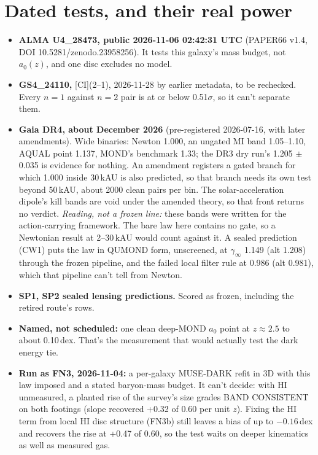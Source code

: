 \documentclass[10pt]{article}
\begin{document}
\section{Dated tests, and their real power}
\begin{itemize}
\item \textbf{ALMA U4\_28473, public 2026-11-06 02:42:31 UTC} (PAPER66 v1.4, DOI 10.5281/zenodo.23958256). It tests this galaxy's mass budget, not $a_0(z)$, and one disc excludes no model.
\item \textbf{GS4\_24110,} [CI](2--1), 2026-11-28 by earlier metadata, to be rechecked. Every $n=1$ against $n=2$ pair is at or below 0.51$\sigma$, so it can't separate them.
\item \textbf{Gaia DR4, about December 2026} (pre-registered 2026-07-16, with later amendments). Wide binaries: Newton 1.000, an ungated MI band 1.05--1.10, AQUAL point 1.137, MOND's benchmark 1.33; the DR3 dry run's 1.205 $\pm$ 0.035 is evidence for nothing. An amendment registers a gated branch for which 1.000 inside 30\,kAU is also predicted, so that branch needs its own test beyond 50\,kAU, about 2000 clean pairs per bin. The solar-acceleration dipole's kill bands are void under the amended theory, so that front returns no verdict. \emph{Reading, not a frozen line:} these bands were written for the action-carrying framework. The bare law here contains no gate, so a Newtonian result at 2--30\,kAU would count against it. A sealed prediction (CW1) puts the law in QUMOND form, unscreened, at $\gamma_\infty$ 1.149 (alt 1.208) through the frozen pipeline, and the failed local filter rule at 0.986 (alt 0.981), which that pipeline can't tell from Newton.
\item \textbf{SP1, SP2 sealed lensing predictions.} Scored as frozen, including the retired route's rows.
\item \textbf{Named, not scheduled:} one clean deep-MOND $a_0$ point at $z\approx2.5$ to about 0.10\,dex. That's the measurement that would actually test the dark energy tie.
\item \textbf{Run as FN3, 2026-11-04:} a per-galaxy MUSE-DARK refit in 3D with this law imposed and a stated baryon-mass budget. It can't decide: with HI unmeasured, a planted rise of the survey's size grades BAND CONSISTENT on both footings (slope recovered +0.32 of 0.60 per unit $z$). Fixing the HI term from local HI disc structure (FN3b) still leaves a bias of up to $-0.16$\,dex and recovers the rise at +0.47 of 0.60, so the test waits on deeper kinematics as well as measured gas.
\end{itemize}
\end{document}
